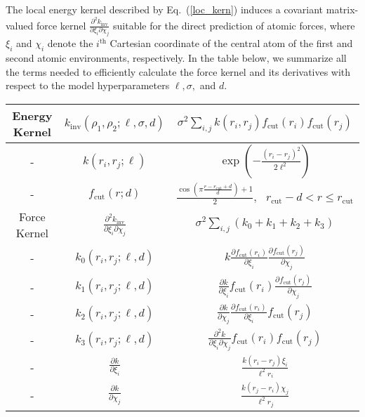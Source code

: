 \documentclass[%
superscriptaddress,
preprint,
amsmath,amssymb,
aps,
]{revtex4-1}
\begin{document}
The local energy kernel described by Eq.\ (\ref{loc_kern}) induces a covariant matrix-valued force kernel $\frac{\partial^2 k_{\text{inv}}}{\partial \xi_i \partial \chi_j}$ suitable for the direct prediction of atomic forces, where $\xi_i$ and $\chi_i$ denote the $i^{\text{th}}$ Cartesian coordinate of the central atom of the first and second atomic environments, respectively. In the table below, we summarize all the terms needed to efficiently calculate the force kernel and its derivatives with respect to the model hyperparameters $\ell, \sigma,$ and $d$.

\begin{center}
    \begin{table}
    \begin{tabular}{ |c|c|c| } 
     \hline
     Energy Kernel & $k_{\text{inv}}(\rho_1, \rho_2; \ell, \sigma, d)$ & $\sigma^2 \sum_{i ,j} k(r_i, r_j) f_{\text{cut}}(r_i) f_{\text{cut}}(r_j)$ \\ 
     \hline
     - & $k(r_i, r_j; \ell)$ & $\exp\left( - \frac{(r_i - r_j)^2}{2 \ell^2} \right)$\\
     \hline
     - & $f_{\text{cut}}(r; d)$ & $\frac{\cos(\pi \frac{r-r_{\text{cut}}+d}{d}) + 1}{2}, \text{ } r_{\text{cut}} - d < r \le r_{\text{cut}}$ \\
     \hline
    Force Kernel & $\frac{\partial^2 k_{\text{inv}}}{\partial \xi_i \partial \chi_j}$ & $\sigma^2 \sum_{i ,j} (k_0 + k_1 + k_2 + k_3)$ \\ 
     \hline
     - & $k_0(r_i, r_j; \ell, d)$ & $k \frac{\partial f_{\text{cut}}(r_i)}{\partial \xi_i} \frac{\partial f_{\text{cut}}(r_j)}{\partial \chi_j}$ \\ 
     \hline
     - & $k_1(r_i, r_j; \ell, d)$ & $\frac{\partial k}{\partial \xi_i} f_{\text{cut}}(r_i) \frac{\partial f_{\text{cut}}(r_j)}{\partial \chi_j}$ \\ 
     \hline
     - & $k_2(r_i, r_j; \ell, d)$ & $\frac{\partial k}{\partial \chi_j} \frac{\partial f_{\text{cut}}(r_i)}{\partial \xi_i} f_{\text{cut}}(r_j)$ \\ 
     \hline
     - & $k_3(r_i, r_j; \ell, d)$ & $\frac{\partial^2 k}{\partial \xi_i \partial \chi_j} f_{\text{cut}}(r_i) f_{\text{cut}}(r_j)$ \\ 
     \hline
     - & $\frac{\partial k}{\partial \xi_i}$ & $\frac{k (r_i-r_j) \xi_i}{\ell^2 r_i}$ \\ 
     \hline
     - & $\frac{\partial k}{\partial \chi_j}$ & $\frac{k (r_j-r_i) \chi_j}{\ell^2 r_j}$ \\ 
     \hline

\end{tabular}
\end{table}
\end{center}
\end{document}
